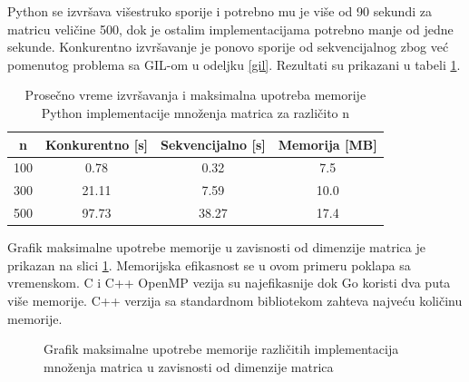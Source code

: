 \documentclass[12pt,oneside]{memoir}
\begin{document}
Python se izvršava višestruko sporije i potrebno mu je više od 90 sekundi za matricu veličine 500, dok je ostalim implementacijama potrebno manje od jedne sekunde. Konkurentno izvršavanje je ponovo sporije od sekvencijalnog zbog već pomenutog problema sa GIL-om u odeljku \ref{gil}. Rezultati su prikazani u tabeli \ref{tab:matrix1}.
\\

\begin{table}
\begin{center}
\caption{Prosečno vreme izvršavanja i maksimalna upotreba memorije Python implementacije množenja matrica za različito n}
\begin{tabular}{||c||c|c|c||}
\hline
n & Konkurentno [s]& Sekvencijalno [s] & Memorija [MB] \\ \hline
100	&0.78	&0.32&7.5\\
300	&21.11&7.59&10.0\\
500	&97.73&38.27&17.4\\
\hline
\end{tabular}
\label{tab:matrix1}
\end{center}
\end{table}


Grafik maksimalne upotrebe memorije u zavisnosti od dimenzije matrica je prikazan na slici \ref{fig:matrix2}. Memorijska efikasnost se u ovom primeru poklapa sa vremenskom. C i C++ OpenMP vezija su najefikasnije dok Go koristi dva puta više memorije. C++ verzija sa standardnom bibliotekom zahteva najveću količinu memorije. 
\newpage

\begin{figure}
\begin{center}


\caption{Grafik maksimalne upotrebe memorije različitih implementacija množenja matrica u zavisnosti od dimenzije matrica}
\label{fig:matrix2}
\end{center}
\end{figure}
\end{document}
